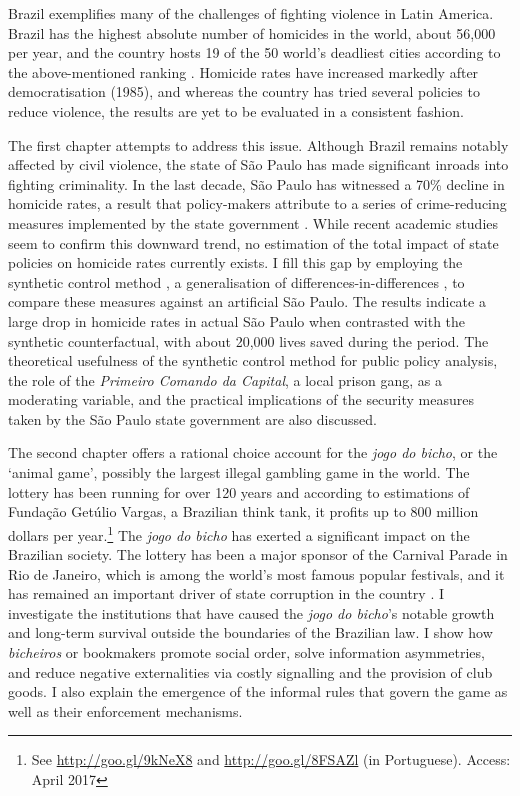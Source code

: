 Brazil exemplifies many of the challenges of fighting violence in Latin America. Brazil has the highest absolute number of homicides in the world, about 56,000 per year, and the country hosts 19 of the 50 world's deadliest cities according to the above-mentioned ranking \citep{mapa2014, mexico2014,unodc2013}. Homicide rates have increased markedly after democratisation (1985), and whereas the country has tried several policies to reduce violence, the results are yet to be evaluated in a consistent fashion. 

The first chapter attempts to address this issue. Although Brazil remains notably affected by civil violence, the state of São Paulo has made significant inroads into fighting criminality. In the last decade, São Paulo has witnessed a 70\% decline in homicide rates, a result that policy-makers attribute to a series of crime-reducing measures implemented by the state government \citep{goertzel2009,kahn2005papel}. While recent academic studies seem to confirm this downward trend, no estimation of the total impact of state policies on homicide rates currently exists. I fill this gap by employing the synthetic control method \citep{abadie2003,abadie2010,abadie2014}, a generalisation of differences-in-differences \citep{angrist2008mostly,bertrand2004much,imbens2009recent}, to compare these measures against an artificial São Paulo. The results indicate a large drop in homicide rates in actual São Paulo when contrasted with the synthetic counterfactual, with about 20,000 lives saved during the period. The theoretical usefulness of the synthetic control method for public policy analysis, the role of the \textit{Primeiro Comando da Capital}, a local prison gang, as a moderating variable, and the practical implications of the security measures taken by the São Paulo state government are also discussed.

The second chapter offers a rational choice account for the \textit{jogo do bicho}, or the `animal game', possibly the largest illegal gambling game in the world. The lottery has been running for over 120 years and according to estimations of Fundação Getúlio Vargas, a Brazilian think tank, it profits up to 800 million dollars per year.\footnote{See \url{http://goo.gl/9kNeX8} and \url{http://goo.gl/8FSAZl} (in Portuguese). Access: April 2017} The \emph{jogo do bicho} has exerted a significant impact on the Brazilian society. The lottery has been a major sponsor of the Carnival Parade in Rio de Janeiro, which is among the world's most famous popular festivals, and it has remained an important driver of state corruption in the country \citep{bezerra2009mecenato,chazkel2011laws,da1999aguias,labronici2012paratodos,magalhaes2005ganhou,soares1993jogo}. I investigate the institutions that have caused the \emph{jogo do bicho}'s notable growth and long-term survival outside the boundaries of the Brazilian law. I show how \textit{bicheiros} or bookmakers promote social order, solve information asymmetries, and reduce negative externalities via costly signalling and the provision of club goods. I also explain the emergence of the informal rules that govern the game as well as their enforcement mechanisms.

